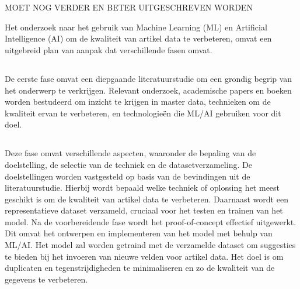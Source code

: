
\chapter{}%
\label{ch:methodologie}

\large MOET NOG VERDER EN BETER UITGESCHREVEN WORDEN

Het onderzoek naar het gebruik van Machine Learning (ML) en Artificial Intelligence (AI) om de kwaliteit van artikel data te verbeteren, omvat een uitgebreid plan van aanpak dat verschillende fasen omvat.

\section{}%
\label{sec:literatuurstudieM}
De eerste fase omvat een diepgaande literatuurstudie om een grondig begrip van het onderwerp te verkrijgen. Relevant onderzoek, academische papers en boeken worden bestudeerd om inzicht te krijgen in master data, technieken om de kwaliteit ervan te verbeteren, en technologieën die ML/AI gebruiken voor dit doel.

\section{}%
\label{sec:Proof-of-ConceptM}
Deze fase omvat verschillende aspecten, waaronder de bepaling van de doelstelling, de selectie van de techniek en de datasetverzameling. De doelstellingen worden vastgesteld op basis van de bevindingen uit de literatuurstudie. Hierbij wordt bepaald welke techniek of oplossing het meest geschikt is om de kwaliteit van artikel data te verbeteren. Daarnaast wordt een representatieve dataset verzameld, cruciaal voor het testen en trainen van het model.
Na de voorbereidende fase wordt het proof-of-concept effectief uitgewerkt. Dit omvat het ontwerpen en implementeren van het model met behulp van ML/AI. Het model zal worden getraind met de verzamelde dataset om suggesties te bieden bij het invoeren van nieuwe velden voor artikel data. Het doel is om duplicaten en tegenstrijdigheden te minimaliseren en zo de kwaliteit van de gegevens te verbeteren.

